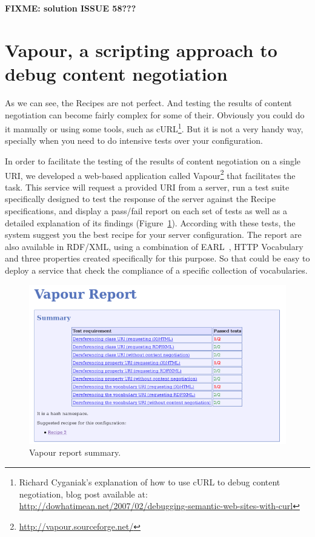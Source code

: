 \textbf{FIXME: solution ISSUE 58???}

\section{Vapour, a scripting approach to debug content negotiation} %

As we can see, the Recipes are not perfect. And testing the results of content 
negotiation can become fairly complex for some of their. Obviously you could do 
it manually or using some tools, such as 
cURL\footnote{Richard Cyganiak's explanation of how to use cURL to debug content negotiation, 
blog post available at: \url{http://dowhatimean.net/2007/02/debugging-semantic-web-sites-with-curl}}.
But it is not a very handy way, specially when you need to do intensive tests over your 
configuration.

In order to facilitate the testing of the results of content negotiation on a single 
URI, we developed a web-based application called Vapour\footnote{\url{http://vapour.sourceforge.net/}} 
that facilitates the task. This service will request a provided URI from a server, 
run a test suite specifically designed to test the response of the server against 
the Recipe specifications, and display a pass/fail report on each set of tests as 
well as a detailed explanation of its  findings (Figure~\ref{fig:report-summary}).
According with these tests, the system suggest you the best recipe for your server configuration. 
The report are also available in RDF/XML, %
using a combination of EARL~\cite{EARL}, HTTP Vocabulary~\cite{Koch2007} and three 
properties created specifically for this purpose. So that could be easy to deploy 
a service that check the compliance of a specific collection of vocabularies.

\begin{figure}
 \centering
 \includegraphics[width=12cm]{images/report-summary.png}
 \caption{\label{fig:report-summary}Vapour report summary.}
\end{figure}

